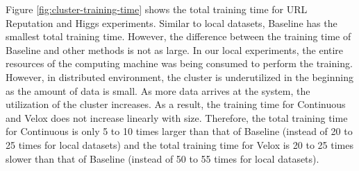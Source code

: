 \documentclass{vldb}
\begin{document}
Figure \ref{fig:cluster-training-time} shows the total training time for URL Reputation and Higgs experiments.
Similar to local datasets, Baseline has the smallest total training time.
However, the difference between the training time of Baseline and other methods is not as large.
In our local experiments, the entire resources of the computing machine was being consumed to perform the training.
However, in distributed environment, the cluster is underutilized in the beginning as the amount of data is small.
As more data arrives at the system, the utilization of the cluster increases.
As a result, the training time for Continuous and Velox does not increase linearly with size.
Therefore, the total training time for Continuous is only 5 to 10 times larger than that of Baseline (instead of 20 to 25 times for local datasets) and the total training time for Velox is 20 to 25 times slower than that of Baseline (instead of 50 to 55 times for local datasets).
\end{document}
